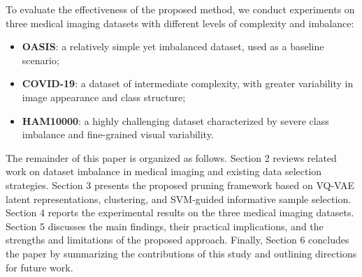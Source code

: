\documentclass[twocolumn]{svjour3}
\begin{document}
To evaluate the effectiveness of the proposed method, we conduct experiments on three medical imaging datasets with different levels of complexity and imbalance:
\begin{itemize}
 \item \textbf{OASIS}: a relatively simple yet imbalanced dataset, used as a baseline scenario;
 \item \textbf{COVID-19}: a dataset of intermediate complexity, with greater variability in image appearance and class structure;
 \item \textbf{HAM10000}: a highly challenging dataset characterized by severe class imbalance and fine-grained visual variability.
\end{itemize}
The remainder of this paper is organized as follows. Section 2 reviews related work on dataset imbalance in medical imaging and existing data selection strategies. Section 3 presents the proposed pruning framework based on VQ-VAE latent representations, clustering, and SVM-guided informative sample selection. Section 4 reports the experimental results on the three medical imaging datasets. Section 5 discusses the main findings, their practical implications, and the strengths and limitations of the proposed approach. Finally, Section 6 concludes the paper by summarizing the contributions of this study and outlining directions for future work.
\end{document}
